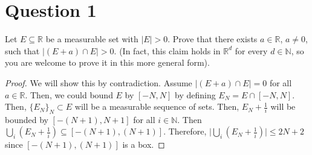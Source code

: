 \section{Question 1}

\begin{question}
    Let $E \subseteq \mathbb{R}$ be a measurable set with $|E|>0$. Prove that there exists $a \in \mathbb{R}$, $a \neq 0$, such that $|(E+a) \cap E|>0$.
    (In fact, this claim holds in $\mathbb{R}^d$ for every $d \in \mathbb{N}$, so you are welcome to prove it in this more general form).
\end{question}

\begin{answer}
    \begin{proof}
        We will show this by contradiction. Assume $\lvert (E+a) \cap E \rvert = 0$ for all $a \in \mathbb{R}$. Then, we could bound $E$ by $[-N,N]$ by defining $E_N = E \cap [-N,N]$. Then, $\{E_N\}_N \subset E$ will be a measurable sequence of sets. Then, $E_N + \tfrac{1}{i}$ will be bounded by $[-(N+1),N+1]$ for all $i \in \mathbb{N}$. Then $\bigcup_i (E_N + \tfrac{1}{i}) \subseteq [-(N+1),(N+1)]$. Therefore, $\lvert \bigcup_i (E_N+\tfrac{1}{i}) \rvert\leq 2N+2$ since $[-(N+1),(N+1)]$ is a box.
        

\end{proof}
\end{answer}
